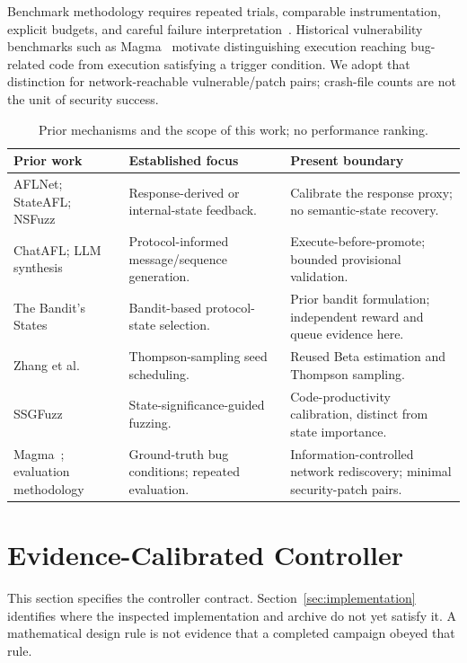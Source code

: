 \documentclass[final,5p,times,number]{elsarticle}
\begin{document}
Benchmark methodology requires repeated trials, comparable instrumentation, explicit budgets, and careful failure interpretation~\cite{profuzzbench_benchmark_stateful_protocol_2021,sok_prudent_evaluation_practices_2024,reliability_benchmarking_2022}. Historical vulnerability benchmarks such as Magma~\cite{magma2020} motivate distinguishing execution reaching bug-related code from execution satisfying a trigger condition. We adopt that distinction for network-reachable vulnerable/patch pairs; crash-file counts are not the unit of security success.

\begin{table}[!tbp]
\centering\small
\caption{Prior mechanisms and the scope of this work; no performance ranking.}
\label{tab:novelty}
\begin{tabularx}{\textwidth}{l Y Y}
\toprule
Prior work & Established focus & Present boundary \\
\midrule
AFLNet; StateAFL; NSFuzz & Response-derived or internal-state feedback. & Calibrate the response proxy; no semantic-state recovery. \\
ChatAFL; LLM synthesis & Protocol-informed message/sequence generation. & Execute-before-promote; bounded provisional validation. \\
The Bandit's States~\cite{bandits_states2023} & Bandit-based protocol-state selection. & Prior bandit formulation; independent reward and queue evidence here. \\
Zhang et al.~\cite{zhang2026thompson} & Thompson-sampling seed scheduling. & Reused Beta estimation and Thompson sampling. \\
SSGFuzz~\cite{ssgfuzz2026} & State-significance-guided fuzzing. & Code-productivity calibration, distinct from state importance. \\
Magma~\cite{magma2020}; evaluation methodology & Ground-truth bug conditions; repeated evaluation. & Information-controlled network rediscovery; minimal security-patch pairs. \\
\bottomrule
\end{tabularx}
\end{table}

\section{Evidence-Calibrated Controller}
\label{sec:design}
This section specifies the controller contract. Section~\ref{sec:implementation} identifies where the inspected implementation and archive do not yet satisfy it. A mathematical design rule is not evidence that a completed campaign obeyed that rule.
\end{document}
